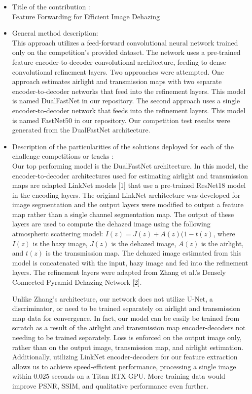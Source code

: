 \documentclass[12pt]{article}
\begin{document}
\begin{itemize}
\item Title of the contribution : \\
Feature Forwarding for Efficient Image Dehazing                                
\item General method description: \\
This approach utilizes a feed-forward convolutional neural network trained only on the competition's provided dataset. The network uses a pre-trained feature encoder-to-decoder convolutional architecture, feeding to dense convolutional refinement layers. Two approaches were attempted. One approach estimates airlight and transmission maps with two separate encoder-to-decoder networks that feed into the refinement layers. This model is named DualFastNet in our repository. The second approach uses a single encoder-to-decoder network that feeds into the refinement layers. This model is named FastNet50 in our repository. Our competition test results were generated from the DualFastNet architecture.

\item Description of the particularities of the solutions deployed for each of the challenge competitions or tracks : \\
Our top performing model is the DualFastNet architecture. In this model, the encoder-to-decoder architectures used for estimating airlight and transmission maps are adapted LinkNet models [1] that use a pre-trained ResNet18 model in the encoding layers. The original LinkNet architecture was developed for image segmentation and the output layers were modified to output a feature map rather than a single channel segmentation map. The output of these layers are used to compute the dehazed image using the following atmospheric scattering model: \(I(z) = J(z) + A(z)(1 - t(z)\), where \(I(z)\) is the hazy image, \(J(z)\) is the dehazed image, \(A(z)\) is the airlight, and \(t(z)\) is the transmission map. The dehazed image estimated from this model is concatenated with the input, hazy image and fed into the refinement layers. The refinement layers were adapted from Zhang et al.'s Densely Connected Pyramid Dehazing Network [2]. 

Unlike Zhang's architecture, our network does not utilize U-Net, a discriminator, or need to be trained separately on airlight and transmission map data for convergence. In fact, our model can be easily be trained from scratch as a result of the airlight and transmission map encoder-decoders not needing to be trained separately. Loss is enforced on the output image only, rather than on the output image, transmission map, and airlight estimation. Additionally, utilizing LinkNet encoder-decoders for our feature extraction allows us to achieve speed-efficient performance, processing a single image within 0.025 seconds on a Titan RTX GPU. More training data would improve PSNR, SSIM, and qualitative performance even further.   


\end{itemize}
\end{document}
